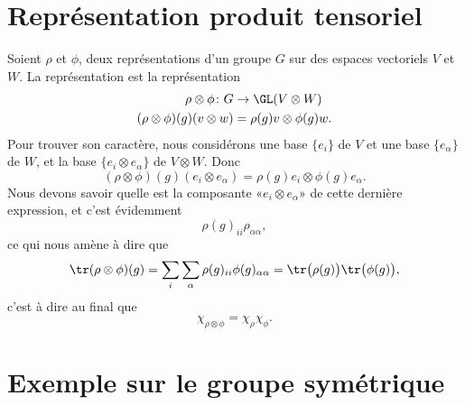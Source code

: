 \section{Représentation produit tensoriel}

Soient \( \rho\) et \( \phi\), deux représentations d'un groupe \( G\) sur des espaces vectoriels \( V\) et \( W\). La représentation  est la représentation
\begin{equation}
    \begin{aligned}
        \rho\otimes\phi\colon G&\to \GL(V\otimes W) \\
        (\rho\otimes\phi)(g)(v\otimes w)&=\rho(g)v\otimes \phi(g)w. 
    \end{aligned}
\end{equation}
Pour trouver son caractère, nous considérons une base \( \{ e_i \}\) de \( V\) et une base \( \{ e_{\alpha} \}\) de \( W\), et la base \( \{ e_i\otimes e_{\alpha} \}\) de \( V\otimes W\). Donc
\begin{equation}
    (\rho\otimes \phi)(g)(e_i\otimes e_{\alpha})=\rho(g)e_i\otimes \phi(g)e_{\alpha}.
\end{equation}
Nous devons savoir quelle est la composante «\( e_i\otimes e_{\alpha}\)» de cette dernière expression, et c'est évidemment
\begin{equation}
    \rho(g)_{ii}\rho_{\alpha\alpha}, 
\end{equation}
ce qui nous amène à dire que
\begin{equation}
    \tr(\rho\otimes \phi)(g)=\sum_i\sum_{\alpha}\rho(g)_{ii}\phi(g)_{\alpha\alpha}=\tr\big( \rho(g) \big)\tr\big( \phi(g) \big),
\end{equation}
c'est à dire au final que
\begin{equation}    \label{EqOTmvfjf}
    \chi_{\rho\otimes \phi}=\chi_{\rho}\chi_{\phi}.
\end{equation}

\section{Exemple sur le groupe symétrique}

